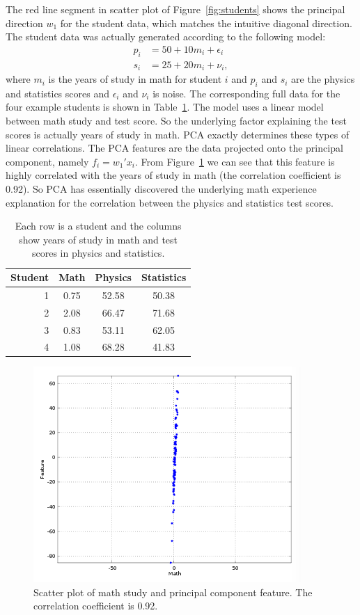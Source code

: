\documentclass{article}
\begin{document}
The red line segment in scatter plot of Figure~\ref{fig:students} shows the principal direction $w_1$ for the student data, which matches the intuitive diagonal direction.  The student data was actually generated according to the following model:
\begin{align}
p_i &= 50 + 10 m_i + \epsilon_i \\
s_i &= 25 + 20 m_i + \nu_i,
\end{align}
where $m_i$ is the years of study in math for student $i$ and $p_i$ and $s_i$ are the physics and statistics scores and $\epsilon_i$ and $\nu_i$ is noise.  The corresponding full data for the four example students is shown in Table~\ref{tab:studentsFull}.  The model uses a linear model between math study and test score.  So the underlying factor explaining the test scores is actually years of study in math.  PCA exactly determines these types of linear correlations.  The PCA features are the data projected onto the principal component, namely $f_i = w_1' x_i$.  From Figure~\ref{fig:mathFeature} we can see that this feature is highly correlated with the years of study in math (the correlation coefficient is 0.92).  So PCA has essentially discovered the underlying math experience explanation for the correlation between the physics and statistics test scores.

\begin{table}
\centering
\begin{tabular}{rccc}
Student & Math & Physics & Statistics \\
\hline
1 & 0.75 & 52.58 & 50.38 \\
2 & 2.08 & 66.47 & 71.68 \\
3 & 0.83 & 53.11 & 62.05 \\
4 & 1.08 & 68.28 & 41.83 \\
\end{tabular}
\caption{Each row is a student and the columns show years of study in math and test scores in physics and statistics.}
\label{tab:studentsFull}
\end{table}

\begin{figure}
\centering
\includegraphics[width=4in]{mathFeature.png}
\caption{Scatter plot of math study and principal component feature.  The correlation coefficient is 0.92.}
\label{fig:mathFeature}
\end{figure}
\end{document}

